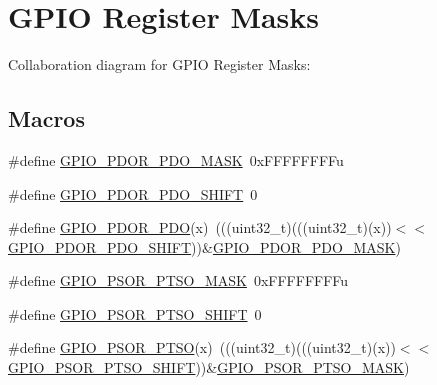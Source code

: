 \hypertarget{group___g_p_i_o___register___masks}{}\section{G\+P\+IO Register Masks}
\label{group___g_p_i_o___register___masks}
Collaboration diagram for G\+P\+IO Register Masks\+:
\subsection*{Macros}
\begin{DoxyCompactItemize}
\item 
\#define \hyperlink{group___g_p_i_o___register___masks_gafd2a8274691295293b3cabfe86089801}{G\+P\+I\+O\+\_\+\+P\+D\+O\+R\+\_\+\+P\+D\+O\+\_\+\+M\+A\+SK}~0x\+F\+F\+F\+F\+F\+F\+F\+Fu
\item 
\#define \hyperlink{group___g_p_i_o___register___masks_ga495b5f1e63de863534ce0c5f25f137ab}{G\+P\+I\+O\+\_\+\+P\+D\+O\+R\+\_\+\+P\+D\+O\+\_\+\+S\+H\+I\+FT}~0
\item 
\#define \hyperlink{group___g_p_i_o___register___masks_ga4071beeff4d9b5c200686972dd52d855}{G\+P\+I\+O\+\_\+\+P\+D\+O\+R\+\_\+\+P\+DO}(x)~(((uint32\+\_\+t)(((uint32\+\_\+t)(x))$<$$<$\hyperlink{group___g_p_i_o___register___masks_ga495b5f1e63de863534ce0c5f25f137ab}{G\+P\+I\+O\+\_\+\+P\+D\+O\+R\+\_\+\+P\+D\+O\+\_\+\+S\+H\+I\+FT}))\&\hyperlink{group___g_p_i_o___register___masks_gafd2a8274691295293b3cabfe86089801}{G\+P\+I\+O\+\_\+\+P\+D\+O\+R\+\_\+\+P\+D\+O\+\_\+\+M\+A\+SK})
\item 
\#define \hyperlink{group___g_p_i_o___register___masks_gaa8a48e38ef70ff1ba3bbcbf31b891da4}{G\+P\+I\+O\+\_\+\+P\+S\+O\+R\+\_\+\+P\+T\+S\+O\+\_\+\+M\+A\+SK}~0x\+F\+F\+F\+F\+F\+F\+F\+Fu
\item 
\#define \hyperlink{group___g_p_i_o___register___masks_ga5a962b85e07477e26afe639c7ca478cb}{G\+P\+I\+O\+\_\+\+P\+S\+O\+R\+\_\+\+P\+T\+S\+O\+\_\+\+S\+H\+I\+FT}~0
\item 
\#define \hyperlink{group___g_p_i_o___register___masks_ga6b16f5841a5c5f20311eafc574f814e4}{G\+P\+I\+O\+\_\+\+P\+S\+O\+R\+\_\+\+P\+T\+SO}(x)~(((uint32\+\_\+t)(((uint32\+\_\+t)(x))$<$$<$\hyperlink{group___g_p_i_o___register___masks_ga5a962b85e07477e26afe639c7ca478cb}{G\+P\+I\+O\+\_\+\+P\+S\+O\+R\+\_\+\+P\+T\+S\+O\+\_\+\+S\+H\+I\+FT}))\&\hyperlink{group___g_p_i_o___register___masks_gaa8a48e38ef70ff1ba3bbcbf31b891da4}{G\+P\+I\+O\+\_\+\+P\+S\+O\+R\+\_\+\+P\+T\+S\+O\+\_\+\+M\+A\+SK})
\item 

\end{DoxyCompactItemize}
